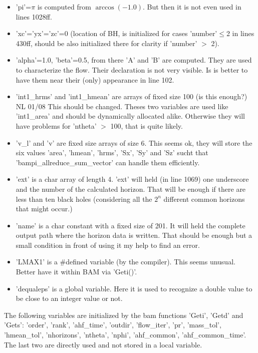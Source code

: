 \documentclass[11pt,a4paper,twoside]{article}
\begin{document}
\begin{itemize}
  \item 'pi'=$\pi$ is computed from $\arccos(-1.0)$. But then it is not even used
         in lines 1028ff.
  \item 'xc'='yx'='zc'=0 (location of BH, is initialized for cases 
         'number'$\le$2 in lines 430ff, should be also initialized there 
         for clarity if 'number' $>$ 2).
  \item 'alpha'=1.0, 'beta'=0.5, from there 'A' and 'B' are computed. They are
        used to characterize the flow. Their declaration is not very visible.
        Is is better to have them near their (only) appearance in line 102.
  \item 'int1\_hrms' and 'int1\_hmean' are arrays of fixed size 100 
       (is this enough?)
          \warningsymbol NL 01/08 This should be changed. Theses two variables  
         are used like 'int1\_area' and should be dynamically allocated alike.
         Otherwise they will have problems for 'ntheta' $>$ 100, that is 
         quite likely.
  \item 'v\_l' and 'v' are fixed size arrays of size 6. This seems ok, they
        will store the six values 'area', 'hmean', 'hrms', 'Sx', 'Sy' and 'Sz' sucht that
        'bampi\_all\-reduce\-\_sum\_vector' can handle them efficiently.
  \item 'ext' is a char array of length 4. 'ext' will held (in line 1069) 
        one underscore and the number of the calculated horizon. 
        That will be enough if
        there are less than ten black holes (considering all the $2^n$
        different common horizons that might occur.)
  \item 'name' is a char constant with a fixed size of 201. It will held
        the complete output path where the horizon data is written. That 
        should be enough but a small condition in front of using it my help to find
        an error.
  \item 'LMAX1' is a \#defined variable (by the compiler). This seems unusual. Better have
        it within BAM via 'Geti()'.
  \item 'dequaleps' is a global variable. Here it is used to recognize a
        double value to be close to an integer value or not.   
\end{itemize}
The following variables are initialized by the bam functions 'Geti', 'Getd' and 'Gets':
'order', 'rank', 'ahf\_time', 'outdir', 'flow\_iter', 'pr', 'mass\_tol',
'hmean\_\-tol', 'nhorizons', 'ntheta', 'nphi', 'ahf\_common', 'ahf\_common\_time'.
The last two are directly used and not stored in a local variable.
\end{document}
